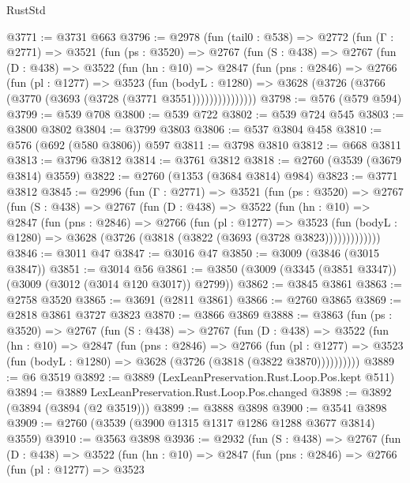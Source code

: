 \begin{lexlean}{RustStd}
\begin{coremodule}
@3771 := @3731 @663
@3796 := @2978
    (fun (tail0 : @538) =>
    @2772
      (fun (Γ : @2771) =>
      @3521
        (fun (ps : @3520) =>
        @2767
          (fun (S : @438) =>
          @2767
            (fun (D : @438) =>
            @3522
              (fun (hn : @10) =>
              @2847
                (fun (pns : @2846) =>
                @2766
                  (fun (pl : @1277) =>
                  @3523
                    (fun (bodyL : @1280) =>
                    @3628 (@3726 (@3766 (@3770 (@3693 (@3728 (@3771 @3551)))))))))))))))
@3798 := @576 (@579 @594)
@3799 := @539 @708
@3800 := @539 @722
@3802 := @539 @724 @545
@3803 := @3800 @3802
@3804 := @3799 @3803
@3806 := @537 @3804 @458
@3810 := @576 (@692 (@580 @3806)) @597
@3811 := @3798 @3810
@3812 := @668 @3811
@3813 := @3796 @3812
@3814 := @3761 @3812
@3818 := @2760 (@3539 (@3679 @3814) @3559)
@3822 := @2760 (@1353 (@3684 @3814) @984)
@3823 := @3771 @3812
@3845 := @2996
    (fun (Γ : @2771) =>
    @3521
      (fun (ps : @3520) =>
      @2767
        (fun (S : @438) =>
        @2767
          (fun (D : @438) =>
          @3522
            (fun (hn : @10) =>
            @2847
              (fun (pns : @2846) =>
              @2766
                (fun (pl : @1277) =>
                @3523
                  (fun (bodyL : @1280) =>
                  @3628 (@3726 (@3818 (@3822 (@3693 (@3728 @3823)))))))))))))
@3846 := @3011 @47
@3847 := @3016 @47
@3850 := @3009 (@3846 (@3015 @3847))
@3851 := @3014 @56
@3861 := @3850 (@3009 (@3345 (@3851 @3347)) (@3009 (@3012 (@3014 @120 @3017)) @2799))
@3862 := @3845 @3861
@3863 := @2758 @3520
@3865 := @3691 (@2811 @3861)
@3866 := @2760 @3865
@3869 := @2818 @3861 @3727 @3823
@3870 := @3866 @3869
@3888 := @3863
    (fun (ps : @3520) =>
    @2767
      (fun (S : @438) =>
      @2767
        (fun (D : @438) =>
        @3522
          (fun (hn : @10) =>
          @2847
            (fun (pns : @2846) =>
            @2766
              (fun (pl : @1277) =>
              @3523 (fun (bodyL : @1280) => @3628 (@3726 (@3818 (@3822 @3870))))))))))
@3889 := @6 @3519
@3892 := @3889 (LexLeanPreservation.Rust.Loop.Pos.kept @511)
@3894 := @3889 LexLeanPreservation.Rust.Loop.Pos.changed
@3898 := @3892 (@3894 (@3894 (@2 @3519)))
@3899 := @3888 @3898
@3900 := @3541 @3898
@3909 := @2760 (@3539 (@3900 @1315 @1317 @1286 @1288 @3677 @3814) @3559)
@3910 := @3563 @3898
@3936 := @2932
    (fun (S : @438) =>
    @2767
      (fun (D : @438) =>
      @3522
        (fun (hn : @10) =>
        @2847
          (fun (pns : @2846) =>
          @2766
            (fun (pl : @1277) =>
            @3523

\end{coremodule}
\end{lexlean}
